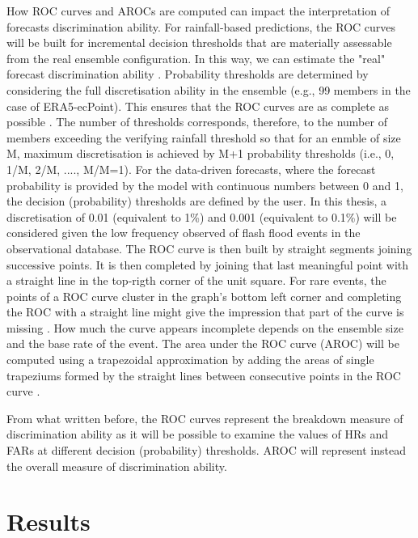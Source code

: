 How ROC curves and AROCs are computed can impact the interpretation of forecasts discrimination ability. For rainfall-based predictions, the ROC curves will be built for incremental decision thresholds that are materially assessable from the real ensemble configuration. In this way, we can estimate the "real" forecast discrimination ability \citep{wilks_statistical_2020}. Probability thresholds are determined by considering the full discretisation ability in the ensemble (e.g., 99 members in the case of ERA5-ecPoint). This ensures that the ROC curves are as complete as possible \citep{Bouallegue_2022}. The number of thresholds corresponds, therefore, to the number of members exceeding the verifying rainfall threshold so that for an enmble of size M, maximum discretisation is achieved by M+1 probability thresholds (i.e., 0, 1/M, 2/M, ...., M/M=1). For the data-driven forecasts, where the forecast probability is provided by the model with continuous numbers between 0 and 1, the decision (probability) thresholds are defined by the user. In this thesis, a discretisation of 0.01 (equivalent to 1\%) and 0.001 (equivalent to 0.1\%) will be considered given the low frequency observed of flash flood events in the observational database. The ROC curve is then built by straight segments joining successive points. It is then completed by joining that last meaningful point with a straight line in the top-rigth corner of the unit square. For rare events, the points of a ROC curve cluster in the graph's bottom left corner and completing the ROC with a straight line might give the impression that part of the curve is missing \citep{Casati_2008}. How much the curve appears incomplete depends on the ensemble size and the base rate of the event. The area under the ROC curve (AROC) will be computed using a trapezoidal approximation by adding the areas of single trapeziums formed by the straight lines between consecutive points in the ROC curve \citep{Bouallegue_2022}. 

From what written before, the ROC curves represent the breakdown measure of discrimination ability as it will be possible to examine the values of HRs and FARs at different decision (probability) thresholds. AROC will represent instead the overall measure of discrimination ability.

\section{Results}
\label{flash_flood_focused_verification_rainfall_based_ff_RESULTS}

